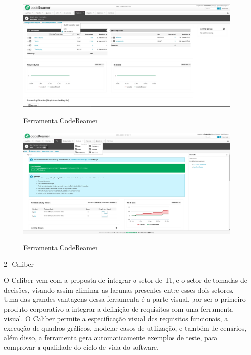 \FloatBarrier
\begin{figure}[!htpd]
		\centering
		\includegraphics[scale=0.27]{figuras/Code01}
		\label{img:SAF}
		\caption{Ferramenta  CodeBeamer}
\end{figure}
\FloatBarrier


\FloatBarrier
\begin{figure}[!htpd]
		\centering
		\includegraphics[scale=0.2]{figuras/Code02}
		\label{img:SAF}
		\caption{ Ferramenta CodeBeamer }
\end{figure}
\FloatBarrier

2- Caliber

O Caliber vem com a proposta de integrar o setor de TI, e o setor de tomadas de decisões, visando assim eliminar as lacunas presentes entre esses dois setores. Uma das grandes vantagens dessa ferramenta é a parte visual, por ser o primeiro produto corporativo a integrar a definição de requisitos com uma ferramenta visual. O Caliber permite a especificação visual dos requisitos funcionais, a execução de quadros gráficos, modelar casos de utilização, e também de cenários, além disso, a ferramenta gera automaticamente exemplos de teste, para comprovar a qualidade do ciclo de vida do software.


